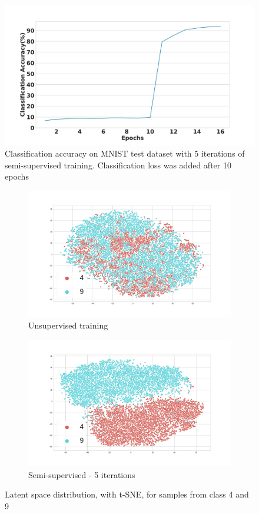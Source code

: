 \documentclass[runningheads]{llncs}
\begin{document}
\begin{figure}[!t]
\centering
  \centering
  \includegraphics[width=.6\linewidth]{images/classification_acc_semi_supervised}
\caption{Classification accuracy on MNIST test dataset with 5 iterations of semi-supervised training. Classification loss was added after 10 epochs}
\label{classificaion_acc}
\end{figure}

\begin{figure}
\centering
\begin{subfigure}[t]{.4\textwidth}
  \centering
  \includegraphics[width=0.8\linewidth]{images/tsne_4_9_unsup.jpg}
  \caption{Unsupervised training}
  \label{tsne_un_4_9}
\end{subfigure}\hfill
\begin{subfigure}[t]{.4\textwidth}
  \centering
  \includegraphics[width=0.8\linewidth]{images/tsne_4_9_semi.jpg}
  \caption{Semi-supervised - 5 iterations}
  \label{tsne_semi_4_9}
\end{subfigure}
\caption{Latent space distribution, with t-SNE, for samples from class 4 and 9}
\label{tsne_4_9}
\end{figure}
\end{document}
